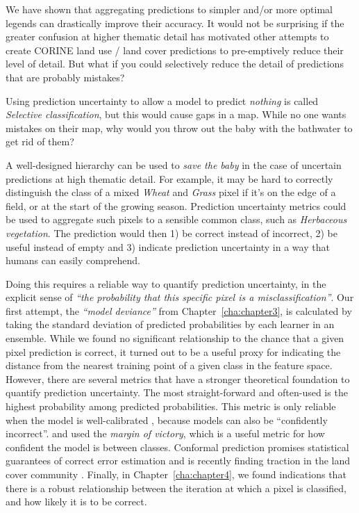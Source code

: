         We have shown that aggregating predictions to simpler and/or more optimal legends can drastically improve their accuracy. It would not be surprising if the greater confusion at higher thematic detail has motivated other attempts to create CORINE land use / land cover predictions to pre-emptively reduce their level of detail. But what if you could selectively reduce the detail of predictions that are probably mistakes? 
        
        Using prediction uncertainty to allow a model to predict \textit{nothing} is called \textit{Selective classification}, but this would cause gaps in a map. While no one wants mistakes on their map, why would you throw out the baby with the bathwater to get rid of them? 
        
        A well-designed hierarchy can be used to \textit{save the baby} in the case of uncertain predictions at high thematic detail. For example, it may be hard to correctly distinguish the class of a mixed \textit{Wheat} and \textit{Grass} pixel if it's on the edge of a field, or at the start of the growing season. Prediction uncertainty metrics could be used to aggregate such pixels to a sensible common class, such as \textit{Herbaceous vegetation}. The prediction would then 1) be correct instead of incorrect, 2) be useful instead of empty and 3) indicate prediction uncertainty in a way that humans can easily comprehend.

        Doing this requires a reliable way to quantify prediction uncertainty, in the explicit sense of \textit{``the probability that this specific pixel is a misclassification''}. Our first attempt, the \textit{``model deviance''} from Chapter\@~\ref{cha:chapter3}, is calculated by taking the standard deviation of predicted probabilities by each learner in an ensemble. While we found no significant relationship to the chance that a given pixel prediction is correct, it turned out to be a useful proxy for indicating the distance from the nearest training point of a given class in the feature space. However, there are several metrics that have a stronger theoretical foundation to quantify prediction uncertainty. The most straight-forward and often-used is the highest probability among predicted probabilities. This metric is only reliable when the model is well-calibrated \citep{niculescu2005predicting}, because models can also be ``confidently incorrect''. \citet{calderon2021high} and \citet{bonannella2023biomes} used the \textit{margin of victory}, which is a useful metric for how confident the model is between classes. Conformal prediction promises statistical guarantees of correct error estimation \citep{angelopoulos2023predictionpowered} and is recently finding traction in the land cover community \citep{valle2023quantifying, singh2024uncertainty}. Finally, in Chapter\@~\ref{cha:chapter4}, we found indications that there is a robust relationship between the iteration at which a pixel is classified, and how likely it is to be correct. 

